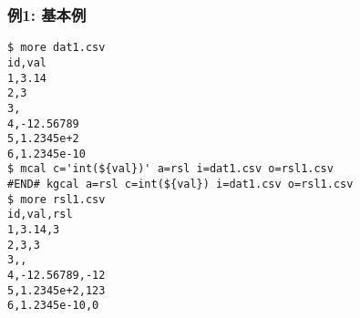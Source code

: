 \subsubsection*{例1: 基本例}



\begin{Verbatim}[baselinestretch=0.7,frame=single]
$ more dat1.csv
id,val
1,3.14
2,3
3,
4,-12.56789
5,1.2345e+2
6,1.2345e-10
$ mcal c='int(${val})' a=rsl i=dat1.csv o=rsl1.csv
#END# kgcal a=rsl c=int(${val}) i=dat1.csv o=rsl1.csv
$ more rsl1.csv
id,val,rsl
1,3.14,3
2,3,3
3,,
4,-12.56789,-12
5,1.2345e+2,123
6,1.2345e-10,0
\end{Verbatim}
